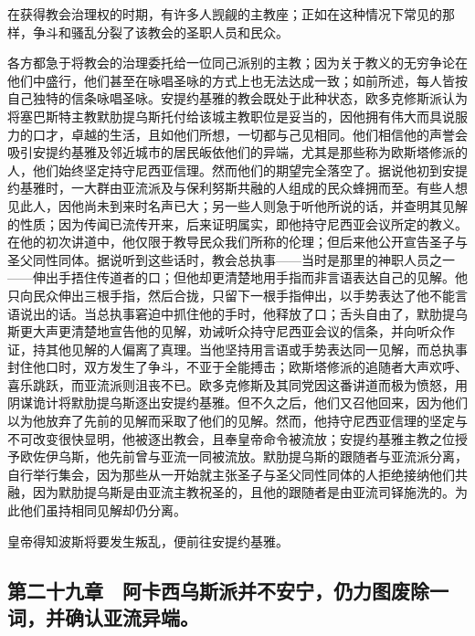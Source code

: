 在获得教会治理权的时期，有许多人觊觎的主教座；正如在这种情况下常见的那样，争斗和骚乱分裂了该教会的圣职人员和民众。\par

各方都急于将教会的治理委托给一位同己派别的主教；因为关于教义的无穷争论在他们中盛行，他们甚至在咏唱圣咏的方式上也无法达成一致；如前所述，每人皆按自己独特的信条咏唱圣咏。安提约基雅的教会既处于此种状态，欧多克修斯派认为将塞巴斯特主教默肋提乌斯托付给该城主教职位是妥当的，因他拥有伟大而具说服力的口才，卓越的生活，且如他们所想，一切都与己见相同。他们相信他的声誉会吸引安提约基雅及邻近城市的居民皈依他们的异端，尤其是那些称为欧斯塔修派的人，他们始终坚定持守尼西亚信理。然而他们的期望完全落空了。据说他初到安提约基雅时，一大群由亚流派及与保利努斯共融的人组成的民众蜂拥而至。有些人想见此人，因他尚未到来时名声已大；另一些人则急于听他所说的话，并查明其见解的性质；因为传闻已流传开来，后来证明属实，即他持守尼西亚会议所定的教义。在他的初次讲道中，他仅限于教导民众我们所称的伦理；但后来他公开宣告圣子与圣父同性同体。据说听到这些话时，教会总执事——当时是那里的神职人员之一——伸出手捂住传道者的口；但他却更清楚地用手指而非言语表达自己的见解。他只向民众伸出三根手指，然后合拢，只留下一根手指伸出，以手势表达了他不能言语说出的话。当总执事窘迫中抓住他的手时，他释放了口；舌头自由了，默肋提乌斯更大声更清楚地宣告他的见解，劝诫听众持守尼西亚会议的信条，并向听众作证，持其他见解的人偏离了真理。当他坚持用言语或手势表达同一见解，而总执事封住他口时，双方发生了争斗，不亚于全能搏击；欧斯塔修派的追随者大声欢呼、喜乐跳跃，而亚流派则沮丧不已。欧多克修斯及其同党因这番讲道而极为愤怒，用阴谋诡计将默肋提乌斯逐出安提约基雅。但不久之后，他们又召他回来，因为他们以为他放弃了先前的见解而采取了他们的见解。然而，他持守尼西亚信理的坚定与不可改变很快显明，他被逐出教会，且奉皇帝命令被流放；安提约基雅主教之位授予欧佐伊乌斯，他先前曾与亚流一同被流放。默肋提乌斯的跟随者与亚流派分离，自行举行集会，因为那些从一开始就主张圣子与圣父同性同体的人拒绝接纳他们共融，因为默肋提乌斯是由亚流主教祝圣的，且他的跟随者是由亚流司铎施洗的。为此他们虽持相同见解却仍分离。\par

皇帝得知波斯将要发生叛乱，便前往安提约基雅。\par


\subsection{第二十九章　阿卡西乌斯派并不安宁，仍力图废除一词，并确认亚流异端。}

